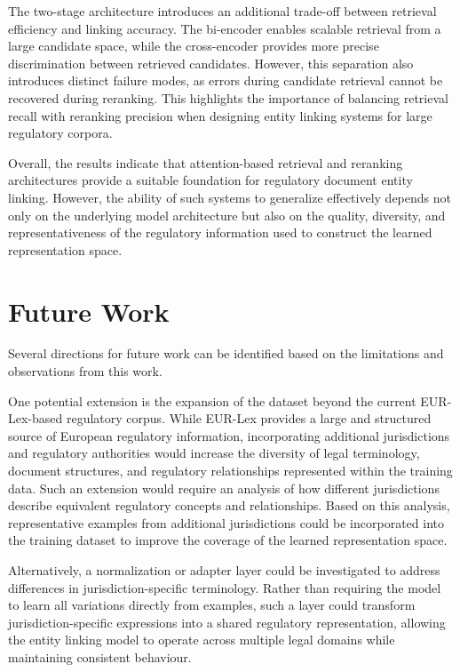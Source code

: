 The two-stage architecture introduces an additional trade-off between retrieval efficiency and linking accuracy. The bi-encoder enables scalable retrieval from a large candidate space, while the cross-encoder provides more precise discrimination between retrieved candidates. However, this separation also introduces distinct failure modes, as errors during candidate retrieval cannot be recovered during reranking. This highlights the importance of balancing retrieval recall with reranking precision when designing entity linking systems for large regulatory corpora.

Overall, the results indicate that attention-based retrieval and reranking architectures provide a suitable foundation for regulatory document entity linking. However, the ability of such systems to generalize effectively depends not only on the underlying model architecture but also on the quality, diversity, and representativeness of the regulatory information used to construct the learned representation space.


\section{Future Work}

Several directions for future work can be identified based on the limitations and observations from this work.

One potential extension is the expansion of the dataset beyond the current EUR-Lex-based regulatory corpus. While EUR-Lex provides a large and structured source of European regulatory information, incorporating additional jurisdictions and regulatory authorities would increase the diversity of legal terminology, document structures, and regulatory relationships represented within the training data. Such an extension would require an analysis of how different jurisdictions describe equivalent regulatory concepts and relationships. Based on this analysis, representative examples from additional jurisdictions could be incorporated into the training dataset to improve the coverage of the learned representation space.

Alternatively, a normalization or adapter layer could be investigated to address differences in jurisdiction-specific terminology. Rather than requiring the model to learn all variations directly from examples, such a layer could transform jurisdiction-specific expressions into a shared regulatory representation, allowing the entity linking model to operate across multiple legal domains while maintaining consistent behaviour.

